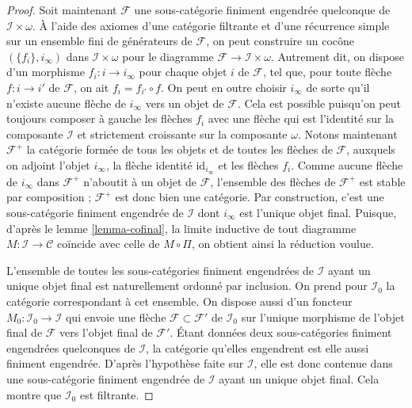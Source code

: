 \begin{proof}
\medskip\noindent
Soit maintenant $\mathcal{F}$ une sous-catégorie finiment engendrée
quelconque de $\mathcal{I}\times \omega$. À l'aide des axiomes d'une catégorie
filtrante et d'une récurrence simple sur un ensemble fini de générateurs de
$\mathcal{F}$, on peut construire un cocône $(\{f_i\}, i_\infty)$ dans
$\mathcal{I} \times \omega$ pour le diagramme
$\mathcal{F} \to \mathcal{I} \times \omega$. Autrement dit, on dispose d'un
morphisme $f_i : i \to i_\infty$ pour chaque objet $i$ de $\mathcal{F}$,
tel que, pour toute flèche $f : i \to i'$ de $\mathcal{F}$, on ait
$f_i = f_{i'} \circ f$. On peut en outre choisir $i_\infty$ de sorte qu'il
n'existe aucune flèche de $i_\infty$ vers un objet de $\mathcal{F}$. Cela est
possible puisqu'on peut toujours composer à gauche les flèches $f_i$ avec
une flèche qui est l'identité sur la composante $\mathcal{I}$ et strictement
croissante sur la composante $\omega$.
Notons maintenant $\mathcal{F}^+$ la catégorie formée de tous les objets et
de toutes les flèches de $\mathcal{F}$, auxquels on adjoint l'objet
$i_\infty$, la flèche identité $\text{id}_{i_\infty}$ et les flèches $f_i$.
Comme aucune flèche de $i_\infty$ dans $\mathcal{F}^+$ n'aboutit à un objet de
$\mathcal{F}$, l'ensemble des flèches de $\mathcal{F}^+$ est stable par
composition ; $\mathcal{F}^+$ est donc bien une catégorie. Par construction,
c'est une sous-catégorie finiment engendrée de $\mathcal{I}$ dont
$i_\infty$ est l'unique objet final. Puisque, d'après le
lemme \ref{lemma-cofinal}, la limite inductive de tout diagramme
$M : \mathcal{I} \to \mathcal{C}$ coïncide avec celle de $M\circ\Pi$, on
obtient ainsi la réduction voulue.

\medskip\noindent
L'ensemble de toutes les sous-catégories finiment engendrées de
$\mathcal{I}$ ayant un unique objet final est naturellement ordonné par
inclusion. On prend pour $\mathcal{I}_0$ la catégorie correspondant à cet
ensemble. On dispose aussi d'un foncteur
$M_0 : \mathcal{I}_0 \to \mathcal{I}$ qui envoie une flèche
$\mathcal{F} \subset \mathcal{F'}$ de $\mathcal{I}_0$ sur l'unique morphisme
de l'objet final de $\mathcal{F}$ vers l'objet final de $\mathcal{F}'$.
Étant données deux sous-catégories finiment engendrées quelconques de
$\mathcal{I}$, la catégorie qu'elles engendrent est elle aussi finiment
engendrée. D'après l'hypothèse faite sur $\mathcal{I}$, elle est donc contenue
dans une sous-catégorie finiment engendrée de $\mathcal{I}$ ayant un unique
objet final. Cela montre que $\mathcal{I}_0$ est filtrante.


\end{proof}
